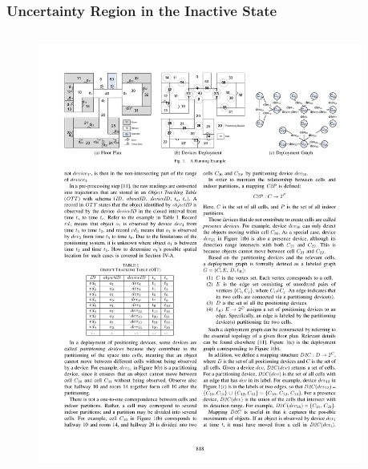 
\begin{frame}
\frametitle{Uncertainty Region in the Inactive State}

\begin{columns}[c]

  \vspace{-10pt}
  \begin{figure}[tb]
    \includegraphics[width=\columnwidth]{figures/2-4/2-4-2.pdf}
  \end{figure}
  \vspace{-15pt}
  \begin{example}
    \textrm{
    }
  \end{example}


\end{columns}
\end{frame}
